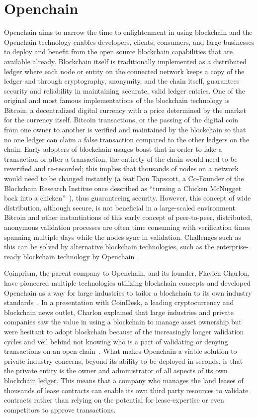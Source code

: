 \section{Openchain}
Openchain aims to narrow the time to enlightenment in using blockchain and the
Openchain technology enables developers, clients, consumers, and large
businesses to deploy and benefit from the open source blockchain capabilities
that are available already. Blockchain itself is traditionally implemented as a
distributed ledger where each node or entity on the connected network keeps a
copy of the ledger and through cryptography, anonymity, and the chain itself,
guarantees security and reliability in maintaining accurate, valid ledger
entries. One of the original and most famous implementations of the blockchain
technology is Bitcoin, a decentralized digital currency with a price determined
by the market for the currency itself. Bitcoin transactions, or the passing of
the digital coin from one owner to another is verified and maintained by the
blockchain so that no one ledger can claim  a false transaction compared to the
other ledgers on the chain. Early adopters of blockchain usages boast that in
order to fake a transaction or alter a transaction, the entirety of the chain
would need to be reverified and re-recorded; this implies that thousands of
nodes on a network would need to be changed instantly (a feat Don Tapscott, a
Co-Founder of the Blockchain Research Institue once described as ``turning a
Chicken McNugget back into a chicken''~\cite{DonTapscottPBS}), thus
guaranteeing security. However, this concept of wide distribution, although
secure, is not beneficial in a large-scaled environment. Bitcoin and other
instantiations of this early concept of peer-to-peer, distributed, anonymous
validation processes are often time consuming with verification times spanning
multiple days while the nodes sync in validation. Challenges such as this can
be solved by alternative blockchain technologies, such as the enterprise-ready
blockchain technology by Openchain~\cite{CoindeskCoinprism}.

Coinprism, the parent company to Openchain, and its founder, Flavien Charlon,
have pioneered multiple technologies utilizing blockchain concepts and
developed Openchain as a way for large industries to tailor a blockchain to its
own industry standards~\cite{BitcoinNewsOpenchain}. In a presentation with
CoinDesk, a leading cryptocurrency and blockchain news outlet, Charlon
explained that large industries and private companies saw the value in using a
blockchain to manage asset ownership but were hesitant to adopt blockchain
because of the increasingly longer validation cycles and veil behind not
knowing who is a part of validating or denying transactions on an open
chain~\cite{CoinDeskCharlonYouTube}. What makes Openchain a viable solution to
private industry concerns, beyond its ability to be deployed in seconds, is
that the private entity is the owner and administrator of all aspects of its
own blockchain ledger. This means that a company who manages the land leases of
thousands of lease contracts can enable its own third party resources to
validate contracts rather than relying on the potential for lease-expertise or
even competitors to approve transactions.


